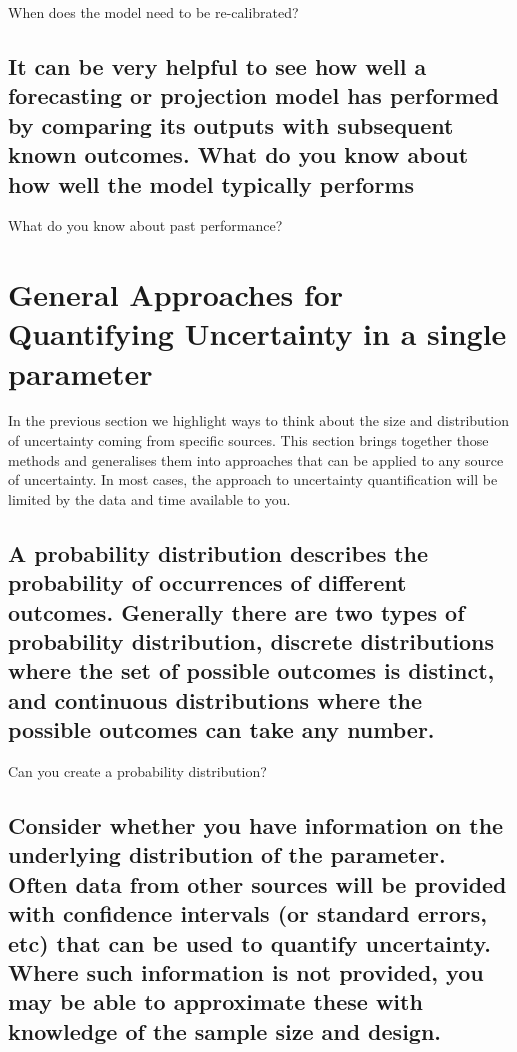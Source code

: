 \documentclass[]{book}
\begin{document}
 When does the model need to be re-calibrated?

\subsection{It can be very helpful to see how well a forecasting or
projection model has performed by comparing its outputs with subsequent
known outcomes. What do you know about how well the model typically
performs}\label{it-can-be-very-helpful-to-see-how-well-a-forecasting-or-projection-model-has-performed-by-comparing-its-outputs-with-subsequent-known-outcomes.-what-do-you-know-about-how-well-the-model-typically-performs}

 What do you know about past performance?

\section{General Approaches for Quantifying Uncertainty in a single
parameter}\label{general-approaches-for-quantifying-uncertainty-in-a-single-parameter}

 In the previous section we highlight ways to think about the size and
distribution of uncertainty coming from specific sources. This section
brings together those methods and generalises them into approaches that
can be applied to any source of uncertainty. In most cases, the approach
to uncertainty quantification will be limited by the data and time
available to you.

\subsection{A probability distribution describes the probability of
occurrences of different outcomes. Generally there are two types of
probability distribution, discrete distributions where the set of
possible outcomes is distinct, and continuous distributions where the
possible outcomes can take any
number.}\label{a-probability-distribution-describes-the-probability-of-occurrences-of-different-outcomes.-generally-there-are-two-types-of-probability-distribution-discrete-distributions-where-the-set-of-possible-outcomes-is-distinct-and-continuous-distributions-where-the-possible-outcomes-can-take-any-number.}

 Can you create a probability distribution?

\subsection{Consider whether you have information on the underlying
distribution of the parameter. Often data from other sources will be
provided with confidence intervals (or standard errors, etc) that can be
used to quantify uncertainty. Where such information is not provided,
you may be able to approximate these with knowledge of the sample size
and
design.}\label{consider-whether-you-have-information-on-the-underlying-distribution-of-the-parameter.-often-data-from-other-sources-will-be-provided-with-confidence-intervals-or-standard-errors-etc-that-can-be-used-to-quantify-uncertainty.-where-such-information-is-not-provided-you-may-be-able-to-approximate-these-with-knowledge-of-the-sample-size-and-design.}
\end{document}
